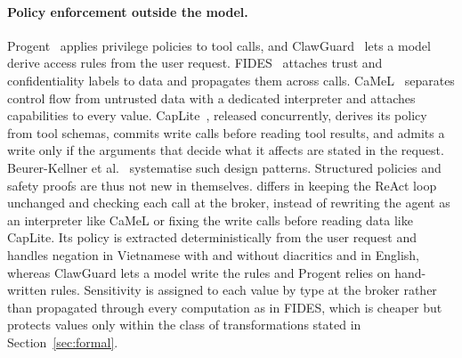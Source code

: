\paragraph{Policy enforcement outside the model.} Progent~\cite{shi2025progent} applies privilege policies to tool
calls, and ClawGuard~\cite{zhao2026clawguard} lets a model derive access rules from the user request.
FIDES~\cite{costa2025fides} attaches trust and confidentiality labels to data and propagates them across calls.
CaMeL~\cite{debenedetti2026camel} separates control flow from untrusted data with a dedicated interpreter and attaches
capabilities to every value. CapLite~\cite{xu2026caplite}, released concurrently, derives its policy from tool schemas,
commits write calls before reading tool results, and admits a write only if the arguments that decide what it affects
are stated in the request. Beurer-Kellner et al.~\cite{beurerkellner2025patterns} systematise such design patterns.
Structured policies and safety proofs are thus not new in themselves. \ours{} differs in keeping the ReAct loop
unchanged and checking each call at the broker, instead of rewriting the agent as an interpreter like CaMeL or fixing
the write calls before reading data like CapLite. Its policy is extracted deterministically from the user request and
handles negation in Vietnamese with and without diacritics and in English, whereas ClawGuard lets a model write the
rules and Progent relies on hand-written rules. Sensitivity is assigned to each value by type at the broker rather than
propagated through every computation as in FIDES, which is cheaper but protects values only within the class of
transformations stated in Section~\ref{sec:formal}.